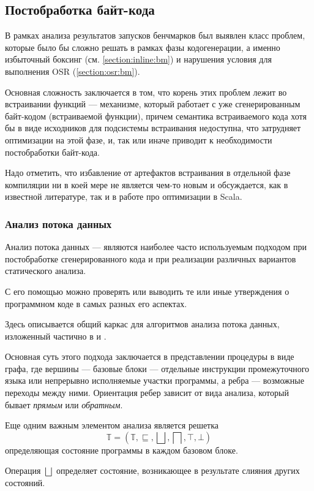 \subsection{Постобработка байт-кода}
\label{section:postp}
В рамках анализа результатов запусков бенчмарков был выявлен класс проблем, которые было бы сложно
решать в рамках фазы кодогенерации, а именно избыточный боксинг (см. \ref{section:inline:bm}) и
нарушения условия для выполнения OSR (\ref{section:osr:bm}).

Основная сложность заключается в том, что корень этих проблем лежит во встраивании функций ---
механизме, который работает с уже сгенерированным байт-кодом (встраиваемой функции), причем
семантика встраиваемого кода хотя бы в виде исходников для подсистемы встраивания недоступна,
что затрудняет оптимизации на этой фазе, и, так или иначе приводит к необходимости постобработки
байт-кода.

Надо отметить, что избавление от артефактов встраивания в отдельной фазе компиляции ни в коей мере
не является чем-то новым и обсуждается, как в известной литературе\cite{Muchnick}, так и в работе
про оптимизации в Scala\cite{ScalaDragos}.

\subsubsection{Анализ потока данных}
Анализ потока данных --- являются наиболее
часто используемым подходом при постобработке сгенерированного кода и при реализации
различных вариантов статического анализа.

С его помощью можно проверять или выводить те или иные утверждения о программном коде в самых разных
его аспектах.

Здесь описывается общий каркас для алгоритмов анализа потока данных, изложенный частично в \cite{Muchnick}
и \cite{Nielson}.

Основная суть этого подхода заключается в представлении процедуры в виде графа, где вершины ---
базовые блоки --- отдельные инструкции промежуточного языка или непрерывно исполняемые участки
программы, а ребра --- возможные переходы между ними.
Ориентация ребер зависит от вида анализа, который бывает \textit{прямым} или \textit{обратным}.

Еще одним важным элементом анализа является решетка
$$\mathbb{T} = (\mathbb{T}, \sqsubseteq, \bigsqcup, \bigsqcap, \top, \bot)$$
определяющая состояние программы в каждом базовом блоке.

Операция $\bigsqcup$ определяет состояние, возникающее в результате слияния других состояний.

